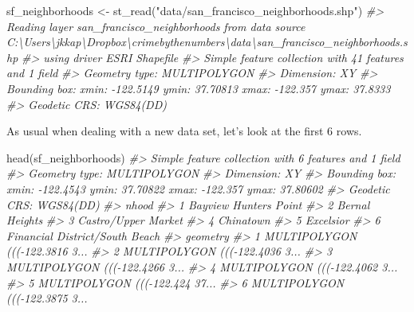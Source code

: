 \documentclass[
]{krantz}
\makeatletter
\newenvironment{Shaded}{\begin{snugshade}}{\end{snugshade}}
\newcommand{\CommentTok}[1]{\textcolor[rgb]{0.37,0.37,0.37}{\textit{#1}}}
\newcommand{\FunctionTok}[1]{\textcolor[rgb]{0,0,0}{#1}}
\newcommand{\NormalTok}[1]{#1}
\newcommand{\OtherTok}[1]{\textcolor[rgb]{0.37,0.37,0.37}{#1}}
\newcommand{\StringTok}[1]{\textcolor[rgb]{0.5,0.5,0.5}{#1}}
\newenvironment{kframe}{%
\medskip{}
\setlength{\fboxsep}{.8em}
 \def\at@end@of@kframe{}%
 \ifinner\ifhmode%
  \def\at@end@of@kframe{\end{minipage}}%
  \begin{minipage}{\columnwidth}%
 \fi\fi%
 \def\FrameCommand##1{\hskip\@totalleftmargin \hskip-\fboxsep
 \colorbox{shadecolor}{##1}\hskip-\fboxsep
     \hskip-\linewidth \hskip-\@totalleftmargin \hskip\columnwidth}%
 \MakeFramed {\advance\hsize-\width
   \@totalleftmargin\z@ \linewidth\hsize
   \@setminipage}}%
 {\par\unskip\endMakeFramed%
 \at@end@of@kframe}
\renewenvironment{Shaded}{\begin{kframe}}{\end{kframe}}
\makeatother
\begin{document}
\begin{Shaded}
\begin{Highlighting}[]
\NormalTok{sf\_neighborhoods }\OtherTok{\textless{}{-}} \FunctionTok{st\_read}\NormalTok{(}\StringTok{"data/san\_francisco\_neighborhoods.shp"}\NormalTok{)}
\CommentTok{\#\textgreater{} Reading layer \textasciigrave{}san\_francisco\_neighborhoods\textquotesingle{} from data source \textasciigrave{}C:\textbackslash{}Users\textbackslash{}jkkap\textbackslash{}Dropbox\textbackslash{}crimebythenumbers\textbackslash{}data\textbackslash{}san\_francisco\_neighborhoods.shp\textquotesingle{} }
\CommentTok{\#\textgreater{}   using driver \textasciigrave{}ESRI Shapefile\textquotesingle{}}
\CommentTok{\#\textgreater{} Simple feature collection with 41 features and 1 field}
\CommentTok{\#\textgreater{} Geometry type: MULTIPOLYGON}
\CommentTok{\#\textgreater{} Dimension:     XY}
\CommentTok{\#\textgreater{} Bounding box:  xmin: {-}122.5149 ymin: 37.70813 xmax: {-}122.357 ymax: 37.8333}
\CommentTok{\#\textgreater{} Geodetic CRS:  WGS84(DD)}
\end{Highlighting}
\end{Shaded}

As usual when dealing with a new data set, let's look at the first 6 rows.

\begin{Shaded}
\begin{Highlighting}[]
\FunctionTok{head}\NormalTok{(sf\_neighborhoods)}
\CommentTok{\#\textgreater{} Simple feature collection with 6 features and 1 field}
\CommentTok{\#\textgreater{} Geometry type: MULTIPOLYGON}
\CommentTok{\#\textgreater{} Dimension:     XY}
\CommentTok{\#\textgreater{} Bounding box:  xmin: {-}122.4543 ymin: 37.70822 xmax: {-}122.357 ymax: 37.80602}
\CommentTok{\#\textgreater{} Geodetic CRS:  WGS84(DD)}
\CommentTok{\#\textgreater{}                            nhood}
\CommentTok{\#\textgreater{} 1          Bayview Hunters Point}
\CommentTok{\#\textgreater{} 2                 Bernal Heights}
\CommentTok{\#\textgreater{} 3            Castro/Upper Market}
\CommentTok{\#\textgreater{} 4                      Chinatown}
\CommentTok{\#\textgreater{} 5                      Excelsior}
\CommentTok{\#\textgreater{} 6 Financial District/South Beach}
\CommentTok{\#\textgreater{}                         geometry}
\CommentTok{\#\textgreater{} 1 MULTIPOLYGON ((({-}122.3816 3...}
\CommentTok{\#\textgreater{} 2 MULTIPOLYGON ((({-}122.4036 3...}
\CommentTok{\#\textgreater{} 3 MULTIPOLYGON ((({-}122.4266 3...}
\CommentTok{\#\textgreater{} 4 MULTIPOLYGON ((({-}122.4062 3...}
\CommentTok{\#\textgreater{} 5 MULTIPOLYGON ((({-}122.424 37...}
\CommentTok{\#\textgreater{} 6 MULTIPOLYGON ((({-}122.3875 3...}
\end{Highlighting}
\end{Shaded}
\end{document}
